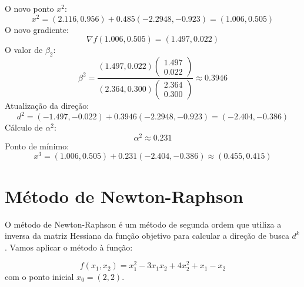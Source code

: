 \documentclass[a4paper, 12pt]{article}
\begin{document}
O novo ponto \( x^2 \):
\[
x^2 = (2.116, 0.956) + 0.485(-2.2948, -0.923) = (1.006, 0.505)
\]
O novo gradiente:
\[
\nabla f(1.006, 0.505) = (1.497, 0.022)
\]
O valor de \( \beta_2 \):
\[
\beta^2 = \frac{(1.497, 0.022) \begin{pmatrix} 1.497 \\ 0.022 \end{pmatrix}}{(2.364, 0.300) \begin{pmatrix} 2.364 \\ 0.300 \end{pmatrix}} \approx 0.3946
\]
Atualização da direção:
\[
d^2 = (-1.497, -0.022) + 0.3946(-2.2948, -0.923) = (-2.404, -0.386)
\]
Cálculo de \( \alpha^2 \):
\[
\alpha^2 \approx 0.231
\]
Ponto de mínimo:
\[
x^3 = (1.006, 0.505) + 0.231(-2.404, -0.386) \approx (0.455, 0.415)
\]


\section{Método de Newton-Raphson}
O método de Newton-Raphson é um método de segunda ordem que utiliza a inversa da matriz Hessiana da função objetivo para calcular a direção de busca \( d^k \). Vamos aplicar o método à função:

\[
f(x_1, x_2) = x_1^2 - 3x_1x_2 + 4x_2^2 + x_1 - x_2
\]
com o ponto inicial \( x_0 = (2, 2) \).
\end{document}
